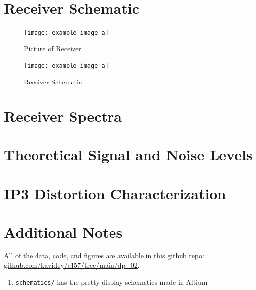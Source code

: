 \documentclass[letterpaper,12pt]{article}
\begin{document}
\newpage
\section{Receiver Schematic}
\begin{figure}[H]
	\begin{centering}
		\texttt{[image: example-image-a]}
		\caption{Picture of Receiver}
	\end{centering}
\end{figure}

\begin{figure}[H]
	\begin{centering}
		\texttt{[image: example-image-a]}
		\caption{Receiver Schematic}
	\end{centering}
\end{figure}

\newpage
\section{Receiver Spectra}

\newpage
\section{Theoretical Signal and Noise Levels}

\newpage
\section{IP3 Distortion Characterization}


\section{Additional Notes}
All of the data, code, and figures are available in this github repo: \url{github.com/kavidey/e157/tree/main/dp_02}.
\begin{enumerate}
  \item \texttt{schematics/} has the pretty display schematics made in Altium
\end{enumerate}
\end{document}

